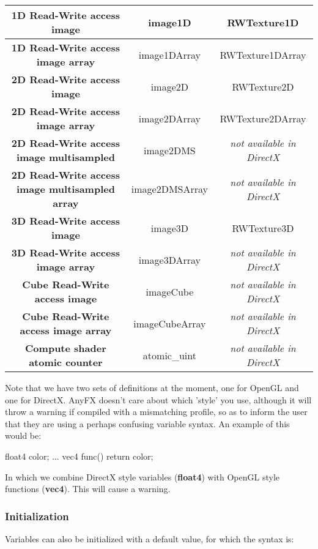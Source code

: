 \documentclass{article}
\begin{document}
\begin{table}[hp]
{\begin{tabular} { | c | c | c | }
	\textbf{1D Read-Write access image} & image1D & RWTexture1D \\ \hline
	\textbf{1D Read-Write access image array} & image1DArray & RWTexture1DArray \\ \hline
	\textbf{2D Read-Write access image} & image2D & RWTexture2D \\ \hline
	\textbf{2D Read-Write access image array} & image2DArray & RWTexture2DArray \\ \hline
	\textbf{2D Read-Write access image multisampled} & image2DMS & \textit{not available in DirectX} \\ \hline
	\textbf{2D Read-Write access image multisampled array} & image2DMSArray & \textit{not available in DirectX} \\ \hline
	\textbf{3D Read-Write access image} & image3D & RWTexture3D \\ \hline
	\textbf{3D Read-Write access image array} & image3DArray & \textit{not available in DirectX} \\ \hline
	\textbf{Cube Read-Write access image} & imageCube & \textit{not available in DirectX} \\ \hline
	\textbf{Cube Read-Write access image array} & imageCubeArray & \textit{not available in DirectX} \\ \hline
	\textbf{Compute shader atomic counter} & atomic\_uint & \textit{not available in DirectX} \\ \hline
\end{tabular}
}
\end{table}

Note that we have two sets of definitions at the moment, one for OpenGL and one for DirectX. AnyFX doesn't care about which 'style' you use, although it will throw a warning if compiled with a mismatching profile, so as to inform the user that they are using a perhaps confusing variable syntax. An example of this would be:

\begin{CodeBox}
	float4 color;
	...
	vec4 func()
	{
		return color;
	}
\end{CodeBox}

In which we combine DirectX style variables (\textbf{float4}) with OpenGL style functions (\textbf{vec4}). This will cause a warning. 

\subsubsection{Initialization}
Variables can also be initialized with a default value, for which the syntax is:
\end{document}
